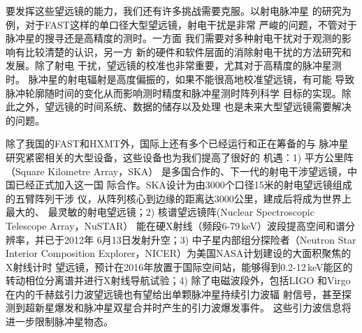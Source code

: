 要发挥这些望远镜的能力，我们还有许多挑战需要克服。以射电脉冲星
的研究为例，对于FAST这样的单口径大型望远镜，射电干扰是非常
严峻的问题，不管对于脉冲星的搜寻还是高精度的测时。一方面
我们需要对多种射电干扰对于观测的影响有比较清楚的认识，另一方
新的硬件和软件层面的消除射电干扰的方法研究和发展。除了射电
干扰，望远镜的校准也非常重要，尤其对于高精度的脉冲星测时。
脉冲星的射电辐射是高度偏振的，如果不能很高地校准望远镜，有可能
导致脉冲轮廓随时间的变化从而影响测时精度和脉冲星测时阵列科学
目标的实现。除此之外，望远镜的时间系统、数据的储存以及处理
也是未来大型望远镜需要解决的问题。

除了我国的FAST和HXMT外，国际上还有多个已经运行和正在筹备的与
脉冲星研究紧密相关的大型设备，这些设备也为我们提高了很好的
机遇：1) 平方公里阵（Square Kilometre Array，SKA）
是多国合作的、下一代的射电干涉望远镜，中国已经正式加入这一国
际合作。SKA设计为由3000个口径15米的射电望远镜组成的五臂阵列干涉
仪，从阵列核心到边缘的距离达3000公里，建成后将成为世界上最大的、
最灵敏的射电望远镜；2) 核谱望远镜阵(Nuclear Spectroscopic Telescope Array，NuSTAR）
能在硬X射线（频段6-79\,keV）波段提高空间和谱分辨率，并已于2012年
6月13日发射升空；3) 中子星内部组分探险者（Neutron Star Interior Composition 
Explorer，NICER）为美国NASA计划建设的大面积聚焦的X射线计时
望远镜，预计在2016年放置于国际空间站，能够得到0.2-12\,keV能区的
转动相位分离谱并进行X射线导航试验；4) 除了电磁波段外，包括LIGO
和Virgo在内的千赫兹引力波望远镜也有望给出单颗脉冲星持续引力波辐
射信号，甚至探测到超新星爆发和脉冲星双星合并时产生的引力波爆发事件。
这些引力波信息将进一步限制脉冲星物态。

\pkuthssffaq

